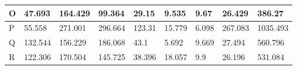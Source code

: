 \begin{landscape}
\begin{longtable}[c]{|l|llllllll|}
    O                                                                               & \multicolumn{1}{l|}{47.693}                                                         & \multicolumn{1}{l|}{164.429}                                                        & \multicolumn{1}{l|}{99.364}                                                         & \multicolumn{1}{l|}{29.15}                                                          & \multicolumn{1}{l|}{9.535}                                     & \multicolumn{1}{l|}{9.67}                                      & \multicolumn{1}{l|}{26.429}                                        & 386.27                                                                                 \\ \hline
    P                                                                               & \multicolumn{1}{l|}{55.558}                                                         & \multicolumn{1}{l|}{271.001}                                                        & \multicolumn{1}{l|}{296.664}                                                        & \multicolumn{1}{l|}{123.31}                                                         & \multicolumn{1}{l|}{15.779}                                    & \multicolumn{1}{l|}{6.098}                                     & \multicolumn{1}{l|}{267.083}                                       & 1035.493                                                                               \\ \hline
    Q                                                                               & \multicolumn{1}{l|}{132.544}                                                        & \multicolumn{1}{l|}{156.229}                                                        & \multicolumn{1}{l|}{186.068}                                                        & \multicolumn{1}{l|}{43.1}                                                           & \multicolumn{1}{l|}{5.692}                                     & \multicolumn{1}{l|}{9.669}                                     & \multicolumn{1}{l|}{27.494}                                        & 560.796                                                                                \\ \hline
    R                                                                               & \multicolumn{1}{l|}{122.306}                                                        & \multicolumn{1}{l|}{170.504}                                                        & \multicolumn{1}{l|}{145.725}                                                        & \multicolumn{1}{l|}{38.396}                                                         & \multicolumn{1}{l|}{18.057}                                    & \multicolumn{1}{l|}{9.9}                                       & \multicolumn{1}{l|}{26.196}                                        & 531.084                                                                                \\ \hline

\end{longtable}
\end{landscape}
